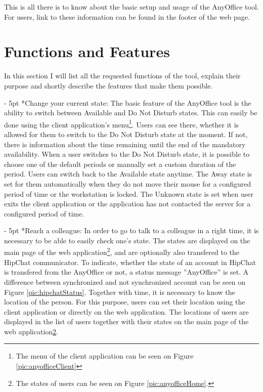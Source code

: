 \documentclass[11pt,singleside]{myfithesis2}
\makeatletter
\renewcommand\paragraph{
   \vspace{-10pt}
   \@startsection{paragraph}{4}{0mm}
      {\baselineskip}
      {- 5pt}
      {\normalfont\normalsize\bfseries}
}
\makeatother
\begin{document}
This is all there is to know about the basic setup and usage of the AnyOffice tool. For users, link to these information can be found in the footer of the web page.


	\section{Functions and Features}
	In this section I will list all the requested functions of the tool, explain their purpose and shortly describe the features that make them possible.
	
\paragraph*{Change your current state: } The basic feature of the AnyOffice tool is the ability to switch between Available and Do Not Disturb states. This can easily be done using the client application's menu\footnote{\label{clientNote}The menu of the client application can be seen on Figure \ref{pic:anyofficeClient}}. Users can see there, whether it is allowed for them to switch to the Do Not Disturb state at the moment. If not, there is information about the time remaining until the end of the mandatory availability. When a user switches to the Do Not Disturb state, it is possible to choose one of the default periods or manually set a custom duration of the period. Users can switch back to the Available state anytime. The Away state is set for them automatically when they do not move their mouse for a configured period of time or the workstation is locked. The Unknown state is set when user exits the client application or the application has not contacted the server for a configured period of time.

\paragraph*{Reach a colleague: } In order to go to talk to a colleague in a right time, it is necessary to be able to easily check one's state. The states are displayed on the main page of the web application\footnote{\label{mainPage}The states of users can be seen on Figure \ref{pic:anyofficeHome}.}, and are optionally also transfered to the HipChat communicator. To indicate, whether the state of an account in HipChat is transfered from the AnyOffice or not, a status message ''AnyOffice'' is set. A difference between synchronized and not synchronized account can be seen on Figure \ref{pic:hipchatStatus}. Together with time, it is necessary to know the location of the person. For this purpose, users can set their location using the client application or directly on the web application. The locations of users are displayed in the list of users together with their states on the main page of the web application\cref{mainPage}.
\end{document}
